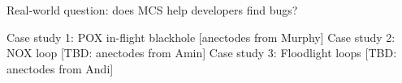 Real-world question: does MCS help developers find bugs?

\begin{outline}
\1 Case study 1: POX in-flight blackhole [anectodes from Murphy]
\1 Case study 2: NOX loop [TBD: anectodes from Amin]
\1 Case study 3: Floodlight loops [TBD: anectodes from Andi]
\end{outline}
